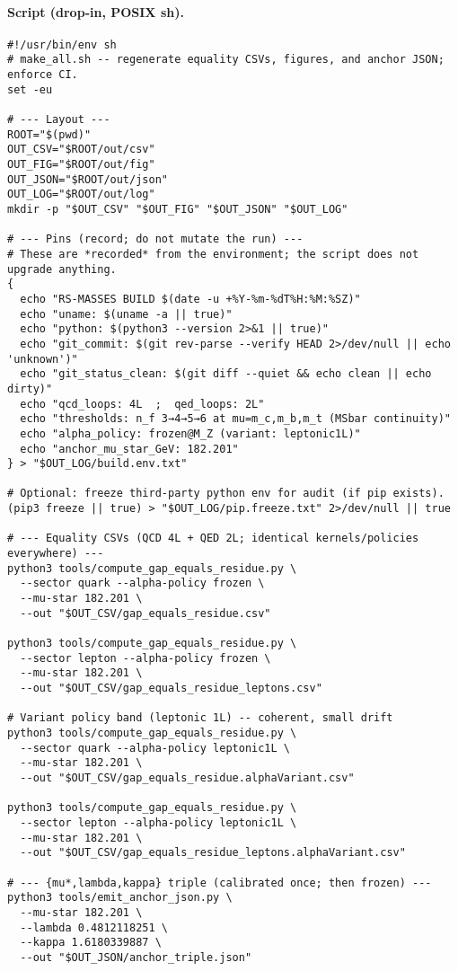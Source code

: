 \documentclass[epjc3]{svjour3}
\begin{document}
\paragraph{Script (drop‑in, POSIX sh).}
\begin{verbatim}
#!/usr/bin/env sh
# make_all.sh -- regenerate equality CSVs, figures, and anchor JSON; enforce CI.
set -eu

# --- Layout ---
ROOT="$(pwd)"
OUT_CSV="$ROOT/out/csv"
OUT_FIG="$ROOT/out/fig"
OUT_JSON="$ROOT/out/json"
OUT_LOG="$ROOT/out/log"
mkdir -p "$OUT_CSV" "$OUT_FIG" "$OUT_JSON" "$OUT_LOG"

# --- Pins (record; do not mutate the run) ---
# These are *recorded* from the environment; the script does not upgrade anything.
{
  echo "RS-MASSES BUILD $(date -u +%Y-%m-%dT%H:%M:%SZ)"
  echo "uname: $(uname -a || true)"
  echo "python: $(python3 --version 2>&1 || true)"
  echo "git_commit: $(git rev-parse --verify HEAD 2>/dev/null || echo 'unknown')"
  echo "git_status_clean: $(git diff --quiet && echo clean || echo dirty)"
  echo "qcd_loops: 4L  ;  qed_loops: 2L"
  echo "thresholds: n_f 3→4→5→6 at mu=m_c,m_b,m_t (MSbar continuity)"
  echo "alpha_policy: frozen@M_Z (variant: leptonic1L)"
  echo "anchor_mu_star_GeV: 182.201"
} > "$OUT_LOG/build.env.txt"

# Optional: freeze third-party python env for audit (if pip exists).
(pip3 freeze || true) > "$OUT_LOG/pip.freeze.txt" 2>/dev/null || true

# --- Equality CSVs (QCD 4L + QED 2L; identical kernels/policies everywhere) ---
python3 tools/compute_gap_equals_residue.py \
  --sector quark --alpha-policy frozen \
  --mu-star 182.201 \
  --out "$OUT_CSV/gap_equals_residue.csv"

python3 tools/compute_gap_equals_residue.py \
  --sector lepton --alpha-policy frozen \
  --mu-star 182.201 \
  --out "$OUT_CSV/gap_equals_residue_leptons.csv"

# Variant policy band (leptonic 1L) -- coherent, small drift
python3 tools/compute_gap_equals_residue.py \
  --sector quark --alpha-policy leptonic1L \
  --mu-star 182.201 \
  --out "$OUT_CSV/gap_equals_residue.alphaVariant.csv"

python3 tools/compute_gap_equals_residue.py \
  --sector lepton --alpha-policy leptonic1L \
  --mu-star 182.201 \
  --out "$OUT_CSV/gap_equals_residue_leptons.alphaVariant.csv"

# --- {mu*,lambda,kappa} triple (calibrated once; then frozen) ---
python3 tools/emit_anchor_json.py \
  --mu-star 182.201 \
  --lambda 0.4812118251 \
  --kappa 1.6180339887 \
  --out "$OUT_JSON/anchor_triple.json"


\end{verbatim}
\end{document}
